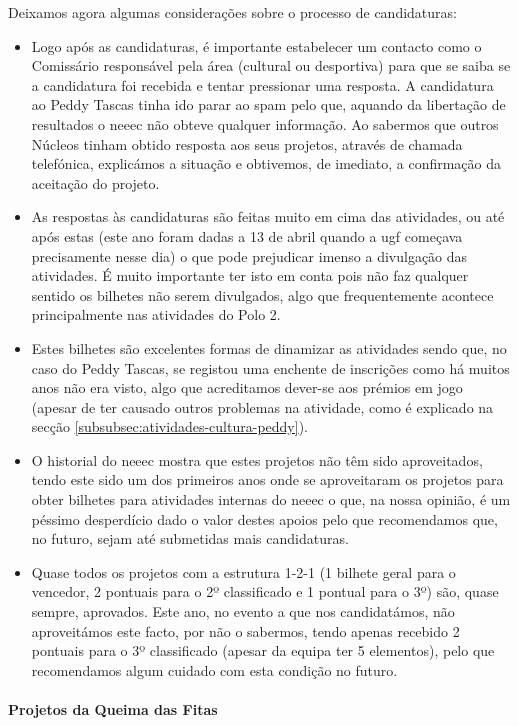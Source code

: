 Deixamos agora algumas considerações sobre o processo de candidaturas:
\begin{itemize}
\item Logo após as candidaturas, é importante estabelecer um contacto como o Comissário responsável pela área (cultural ou desportiva) para que se saiba se a candidatura foi recebida e tentar pressionar uma resposta. A candidatura ao Peddy Tascas tinha ido parar ao spam pelo que, aquando da libertação de resultados o \acrshort{neeec} não obteve qualquer informação. Ao sabermos que outros Núcleos tinham obtido resposta aos seus projetos, através de chamada telefónica, explicámos a situação e obtivemos, de imediato, a confirmação da aceitação do projeto.
\item As respostas às candidaturas são feitas muito em cima das atividades, ou até após estas (este ano foram dadas a 13 de abril quando a \acrshort{ugf} começava precisamente nesse dia) o que pode prejudicar imenso a divulgação das atividades. É muito importante ter isto em conta pois não faz qualquer sentido os bilhetes não serem divulgados, algo que frequentemente acontece principalmente nas atividades do Polo 2.
\item Estes bilhetes são excelentes formas de dinamizar as atividades sendo que, no caso do Peddy Tascas, se registou uma enchente de inscrições como há muitos anos não era visto, algo que acreditamos dever-se aos prémios em jogo (apesar de ter causado outros problemas na atividade, como é explicado na secção \ref{subsubsec:atividades-cultura-peddy}).
\item O historial do \acrshort{neeec} mostra que estes projetos não têm sido aproveitados, tendo este sido um dos primeiros anos onde se aproveitaram os projetos para obter bilhetes para atividades internas do \acrshort{neeec} o que, na nossa opinião, é um péssimo desperdício dado o valor destes apoios pelo que recomendamos que, no futuro, sejam até submetidas mais candidaturas.
\item Quase todos os projetos com a estrutura 1-2-1 (1 bilhete geral para o vencedor, 2 pontuais para o 2º classificado e 1 pontual para o 3º) são, quase sempre, aprovados. Este ano, no evento a que nos candidatámos, não aproveitámos este facto, por não o sabermos, tendo apenas recebido 2 pontuais para o 3º classificado (apesar da equipa ter 5 elementos), pelo que recomendamos algum cuidado com esta condição no futuro.
\end{itemize}

\paragraph{Projetos da Queima das Fitas}

